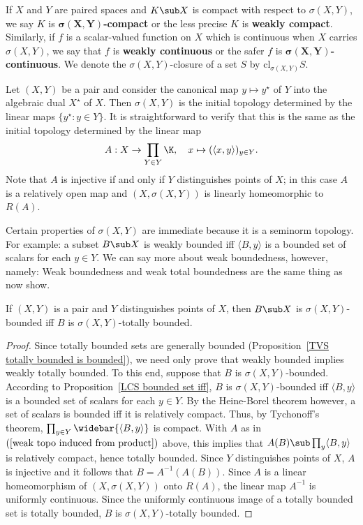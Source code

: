 If $X$ and $Y$ are paired spaces and $K\sub X$ is compact with respect to $\sigma(X,Y)$, we say $K$ is \textbf{$\bm{\sigma(X,Y)}$-compact} or the less precise $K$ is \textbf{weakly compact}. Similarly, if $f$ is a scalar-valued function on $X$ which is continuous when $X$ carries $\sigma(X,Y)$, we say that $f$ is \textbf{weakly continuous} or the safer $f$ is \textbf{$\bm{\sigma(X,Y)}$-continuous}. We denote the $\sigma(X,Y)$-closure of a set $S$ by $\mathrm{cl}_{\sigma(X,Y)}S$.
\begin{example}
Let $(X,Y)$ be a pair and consider the canonical map $y\mapsto y^{\star}$ of $Y$ into the algebraic dual $X^{\star}$ of $X$. Then $\sigma(X,Y)$ is the initial topology determined by the linear maps $\{y^{\star}:y\in Y\}$. It is straightforward to verify that this is the same as the initial topology determined by the linear map
\begin{align}\label{weak topo induced from product}
A:X\to\prod_{Y\in Y}\K,\quad x\mapsto(\langle x,y\rangle)_{y\in Y}.
\end{align}
Note that $A$ is injective if and only if $Y$ distinguishes points of $X$; in this case $A$ is a relatively open map and $(X,\sigma(X, Y))$ is linearly homeomorphic to $R(A)$.
\end{example}
Certain properties of $\sigma(X,Y)$ are immediate because it is a seminorm topology. For example: a subset $B\sub X$ is weakly bounded iff $\langle B,y\rangle$ is a bounded set of scalars for each $y\in Y$. We can say more about weak boundedness, however, namely: Weak boundedness and weak total boundedness are the same thing as now show.
\begin{proposition}\label{weak topo bounded iff totally bounded}
If $(X,Y)$ is a pair and $Y$ distinguishes points of $X$, then $B\sub X$ is $\sigma(X,Y)$-bounded iff $B$ is $\sigma(X,Y)$-totally bounded.
\end{proposition}
\begin{proof}
Since totally bounded sets are generally bounded (Proposition~\ref{TVS totally bounded is bounded}), we need only prove that weakly bounded implies weakly totally bounded. To this end, suppose that $B$ is $\sigma(X,Y)$-bounded. According to Proposition~\ref{LCS bounded set iff}, $B$ is $\sigma(X,Y)$-bounded iff $\langle B,y\rangle$ is a bounded set of scalars for each $y\in Y$. By the Heine-Borel theorem however, a set of scalars is bounded iff it is relatively compact. Thus, by Tychonoff's theorem, $\prod_{y\in Y}\widebar{\langle B,y\rangle}$ is compact. With $A$ as in $(\ref{weak topo induced from product})$ above, this implies that $A(B)\sub\prod_y\langle B,y\rangle$ is relatively compact, hence totally bounded. Since $Y$ distinguishes points of $X$, $A$ is injective and it follows that $B=A^{-1}(A(B))$. Since $A$ is a linear homeomorphism of $(X,\sigma(X,Y))$ onto $R(A)$, the linear map $A^{-1}$ is uniformly continuous. Since the uniformly continuous image of a totally bounded set is totally bounded, $B$ is $\sigma(X,Y)$-totally bounded.
\end{proof}
